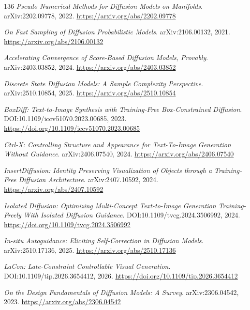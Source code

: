 \documentclass[11pt,a4paper]{article}
\begin{document}
\begin{thebibliography}{136}
\newblock \emph{Pseudo Numerical Methods for Diffusion Models on Manifolds}.
\newblock arXiv:2202.09778, 2022.
\newblock \url{https://arxiv.org/abs/2202.09778}

\newblock \emph{On Fast Sampling of Diffusion Probabilistic Models}.
\newblock arXiv:2106.00132, 2021.
\newblock \url{https://arxiv.org/abs/2106.00132}

\newblock \emph{Accelerating Convergence of Score-Based Diffusion Models, Provably}.
\newblock arXiv:2403.03852, 2024.
\newblock \url{https://arxiv.org/abs/2403.03852}

\newblock \emph{Discrete State Diffusion Models: A Sample Complexity Perspective}.
\newblock arXiv:2510.10854, 2025.
\newblock \url{https://arxiv.org/abs/2510.10854}

\newblock \emph{BoxDiff: Text-to-Image Synthesis with Training-Free Box-Constrained Diffusion}.
\newblock DOI:10.1109/iccv51070.2023.00685, 2023.
\newblock \url{https://doi.org/10.1109/iccv51070.2023.00685}

\newblock \emph{Ctrl-X: Controlling Structure and Appearance for Text-To-Image Generation Without Guidance}.
\newblock arXiv:2406.07540, 2024.
\newblock \url{https://arxiv.org/abs/2406.07540}

\newblock \emph{InsertDiffusion: Identity Preserving Visualization of Objects through a Training-Free Diffusion Architecture}.
\newblock arXiv:2407.10592, 2024.
\newblock \url{https://arxiv.org/abs/2407.10592}

\newblock \emph{Isolated Diffusion: Optimizing Multi-Concept Text-to-Image Generation Training-Freely With Isolated Diffusion Guidance}.
\newblock DOI:10.1109/tvcg.2024.3506992, 2024.
\newblock \url{https://doi.org/10.1109/tvcg.2024.3506992}

\newblock \emph{In-situ Autoguidance: Eliciting Self-Correction in Diffusion Models}.
\newblock arXiv:2510.17136, 2025.
\newblock \url{https://arxiv.org/abs/2510.17136}

\newblock \emph{LaCon: Late-Constraint Controllable Visual Generation}.
\newblock DOI:10.1109/tip.2026.3654412, 2026.
\newblock \url{https://doi.org/10.1109/tip.2026.3654412}

\newblock \emph{On the Design Fundamentals of Diffusion Models: A Survey}.
\newblock arXiv:2306.04542, 2023.
\newblock \url{https://arxiv.org/abs/2306.04542}


\end{thebibliography}
\end{document}
